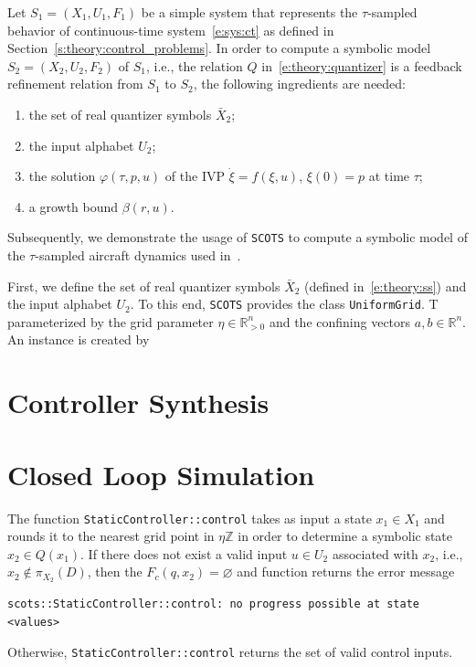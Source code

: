 \documentclass[a4paper]{amsart}
\newcommand{\R}{\mathbb{R}}
\newcommand{\Z}{\mathbb{Z}}
\renewcommand{\emptyset}{{\varnothing}}
\begin{document}
Let $S_1=(X_1,U_1,F_1)$ be a simple system that represents the $\tau$-sampled
behavior of continuous-time system~\eqref{e:sys:ct} as defined in
Section~\ref{s:theory:control_problems}. In order to compute a symbolic model
$S_2=(X_2,U_2,F_2)$ of $S_1$, i.e., the relation $Q$ in~\ref{e:theory:quantizer} is a feedback
refinement relation from $S_1$ to $S_2$, the following ingredients are needed:
\begin{enumerate}
  \item the set of real quantizer symbols $\bar X_2$;
  \item the input alphabet $U_2$;
  \item the solution $\varphi(\tau,p,u)$ of the IVP $\dot \xi = f(\xi,u)$,
  $\xi(0)=p$ at time $\tau$;
  \item a growth bound $\beta(r,u)$.
\end{enumerate}
Subsequently, we demonstrate the usage of {\tt SCOTS} to compute a symbolic
model of the $\tau$-sampled aircraft dynamics used
in~\cite[Sec.~IX.B]{ReissigWeberRungger15}. 

First, we define the set of real quantizer symbols $\bar X_2$ (defined
in~\eqref{e:theory:ss}) and the input
alphabet $U_2$. To this end, {\tt SCOTS} provides the class {\tt UniformGrid}. T  parameterized by the
grid parameter $\eta\in \R^n_{>0}$ and the confining vectors  $a,b\in \R^n$. An
instance is created by

\section{Controller Synthesis}
\label{s:usage:synthesis}

\section{Closed Loop Simulation}
\label{s:usage:simulation}
The
function {\tt StaticController::control} takes as input a state $x_1\in X_1$ and
rounds it to the nearest grid point in $\eta\Z$ in order to determine a
symbolic state $x_2\in Q(x_1)$. If there does not exist a valid input $u\in U_2$
associated with $x_2$, i.e., $x_2\not\in \pi_{X_2}(D)$, then the
$F_c(q,x_2)=\emptyset$ and function returns the error message
\begin{lstlisting}[basicstyle=\small\ttfamily]
scots::StaticController::control: no progress possible at state <values> 
\end{lstlisting}
Otherwise, {\tt StaticController::control} returns the set of valid control
inputs.
\end{document}
